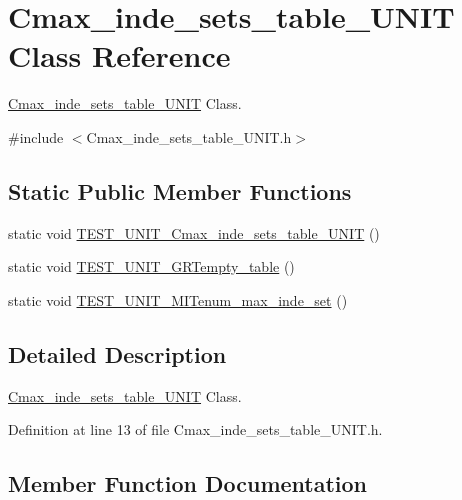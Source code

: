 \hypertarget{class_cmax__inde__sets__table___u_n_i_t}{}\section{Cmax\+\_\+inde\+\_\+sets\+\_\+table\+\_\+\+U\+N\+I\+T Class Reference}
\label{class_cmax__inde__sets__table___u_n_i_t}


\hyperlink{class_cmax__inde__sets__table___u_n_i_t}{Cmax\+\_\+inde\+\_\+sets\+\_\+table\+\_\+\+U\+N\+I\+T} Class.  




{\ttfamily \#include $<$Cmax\+\_\+inde\+\_\+sets\+\_\+table\+\_\+\+U\+N\+I\+T.\+h$>$}

\subsection*{Static Public Member Functions}
\begin{DoxyCompactItemize}
\item 
static void \hyperlink{class_cmax__inde__sets__table___u_n_i_t_a75bcff54dd34336b348593725f896877}{T\+E\+S\+T\+\_\+\+U\+N\+I\+T\+\_\+\+Cmax\+\_\+inde\+\_\+sets\+\_\+table\+\_\+\+U\+N\+I\+T} ()
\item 
static void \hyperlink{class_cmax__inde__sets__table___u_n_i_t_a18652790c12614ac78d0a284ce8b5e3d}{T\+E\+S\+T\+\_\+\+U\+N\+I\+T\+\_\+\+G\+R\+Tempty\+\_\+table} ()
\item 
static void \hyperlink{class_cmax__inde__sets__table___u_n_i_t_a798094cd2bdc9687bc180bbf6faa7678}{T\+E\+S\+T\+\_\+\+U\+N\+I\+T\+\_\+\+M\+I\+Tenum\+\_\+max\+\_\+inde\+\_\+set} ()
\end{DoxyCompactItemize}


\subsection{Detailed Description}
\hyperlink{class_cmax__inde__sets__table___u_n_i_t}{Cmax\+\_\+inde\+\_\+sets\+\_\+table\+\_\+\+U\+N\+I\+T} Class. 

Definition at line 13 of file Cmax\+\_\+inde\+\_\+sets\+\_\+table\+\_\+\+U\+N\+I\+T.\+h.



\subsection{Member Function Documentation}
\hypertarget{class_cmax__inde__sets__table___u_n_i_t_a75bcff54dd34336b348593725f896877}{}
